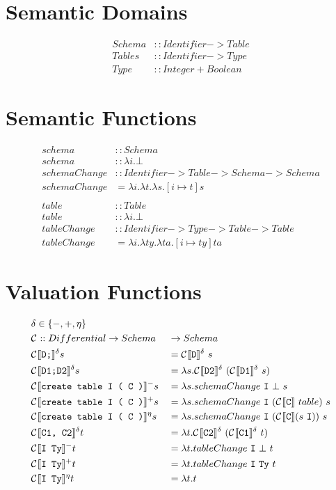 \documentclass[12pt]{article}
\begin{document}
\section{Semantic Domains}
\begin{align*}
  Schema &:: Identifier -> Table \\
  Tables &:: Identifier -> Type \\
  Type &:: Integer + Boolean
\end{align*}

\section{Semantic Functions}
\begin{align*}
  schema &:: Schema \\
  schema &:: \lambda i.\bot \\
  schemaChange &:: Identifier -> Table -> Schema -> Schema \\
  schemaChange &= \lambda i. \lambda t. \lambda s. [ i \mapsto t ]s \\
  \\
  table &:: Table \\
  table &:: \lambda i.\bot \\
  tableChange &:: Identifier -> Type -> Table -> Table \\
  tableChange &= \lambda i. \lambda ty. \lambda ta. [ i \mapsto ty ]ta
\end{align*}

\section{Valuation Functions}

\begin{alignat*}{2}
  &\delta \in \{-, +, \eta \} &&\\
  &\compsymbol :: Differential -> Schema &&-> Schema \\
  &\comp{D;}{}^{\delta}s &&= \comp{D}{}^{\delta}\ s \\
  &\comp{D1;D2}{}^{\delta}s &&= \lambda s.\comp{D2}{}^{\delta}\ (\comp{D1}{}^{\delta}\ s) \\
  &\comp{create table I ( C )}{}^{-}s &&= \lambda s. schemaChange\ \mathtt{I}\ \bot\ s \\
  &\comp{create table I ( C )}{}^{+}s &&= \lambda s. schemaChange\ \mathtt{I}\ (\comp{C}{}\ table)\ s \\
  &\comp{create table I ( C )}{}{}^{\eta}s &&= \lambda s. schemaChange\ \mathtt{I}\ (\comp{C}{} (s\ \mathtt{I}))\ s\\
  &\comp{C1, C2}{}^{\delta}t &&= \lambda t.\comp{C2}{}^{\delta}\ (\comp{C1}{}^{\delta}\ t) \\
  &\comp{I Ty}{}^{-}t &&= \lambda t.tableChange\ \mathtt{I}\ \bot\ t \\
  &\comp{I Ty}{}^{+}t &&= \lambda t.tableChange\ \mathtt{I}\ \mathtt{Ty}\ t \\
  &\comp{I Ty}{}^{\eta}t &&= \lambda t. t \\
\end{alignat*}
\end{document}
